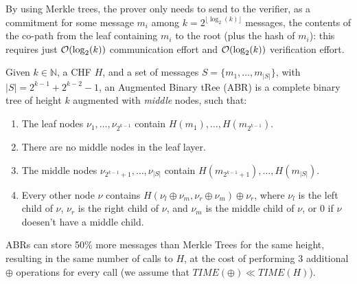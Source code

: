 \noindent By using Merkle trees, the prover only needs to send to the verifier, as a commitment for
some message \(m_i\) among \(k = 2^{\lfloor\log_2(k)\rfloor}\) messages, the contents of the
co-path from the leaf containing \(m_i\) to the root (plus the hash of \(m_i\)): this requires just
\(\mathcal{O}(\log_2(k))\)
communication effort and \(\mathcal{O}(\log_2(k))\) verification effort.
\begin{definition}
	Given \(k \in \mathbb{N}\), a CHF \(H\), and a set of messages \(S = \{m_1, \dots, m_{|S|}\} \),
	with \(|S| = 2^{k-1} + 2^{k-2}-1\), an Augmented Binary tRee (ABR) is a complete binary tree of
	height \(k\) augmented with \emph{middle} nodes, such that:
	\begin{enumerate}
		\item The leaf nodes \(\nu_{1}, \dots, \nu_{2^{k-1}}\) contain \(H(m_1), \dots,
		      H(m_{2^{k-1}})\).
		\item There are no middle nodes in the leaf layer.
		\item The middle nodes \(\nu_{2^{k-1}+1}, \dots, \nu_{|S|}\) contain
		      \(H(m_{2^{k-1}+1}), \dots, H(m_{|S|})\).
		\item Every other node \(\nu \) contains \(H(\nu_l \oplus \nu_m, \nu_r \oplus \nu_m)
		      \oplus \nu_r \), where \(\nu_l\) is the left child of \(\nu \), \(\nu_r\) is the right
		      child of \(\nu \), and \(\nu_m\) is the middle child of \(\nu \), or
		      \(0\) if \(\nu \) doesen't have a middle child.
	\end{enumerate}
\end{definition}

\noindent ABRs can store 50\% more messages than Merkle Trees for the same height, resulting in the
same number of calls to \(H\), at the cost of performing 3 additional \(\oplus \) operations for
every call (we assume that \(TIME(\oplus) \ll TIME(H)\)).
